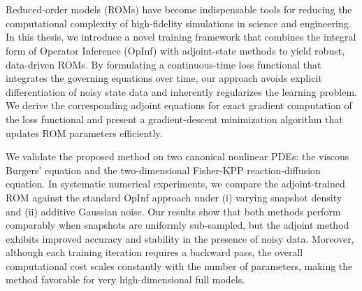 
\chapter*{\abstractname}


Reduced-order models (ROMs) have become indispensable tools for reducing the computational complexity of high-fidelity simulations in science and engineering.  In this thesis, we introduce a novel training framework that combines the integral form of Operator Inference (OpInf) with adjoint-state methods to yield robust, data-driven ROMs. By formulating a continuous-time loss functional that integrates the governing equations over time, our approach avoids explicit differentiation of noisy state data and inherently regularizes the learning problem. We derive the corresponding adjoint equations for exact gradient computation of the loss functional and present a gradient-descent minimization algorithm that updates ROM parameters efficiently.

We validate the proposed method on two canonical nonlinear PDEs: the viscous Burgers’ equation and the two-dimensional Fisher-KPP reaction-diffusion equation. In systematic numerical experiments, we compare the adjoint-trained ROM against the standard OpInf approach under (i) varying snapshot density and (ii) additive Gaussian noise. Our results show that both methods perform comparably when snapshots are uniformly sub-sampled, but the adjoint method exhibits improved accuracy and stability in the presence of noisy data.  Moreover, although each training iteration requires a backward pass, the overall computational cost scales constantly with the number of parameters, making the method favorable for very high-dimensional full models.



  




